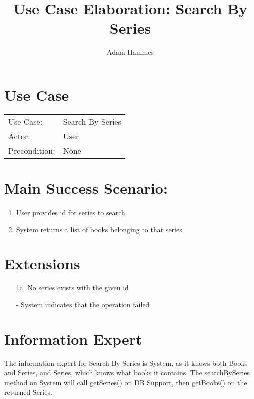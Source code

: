 \documentclass{article}
\title{Use Case Elaboration: Search By Series}
\author{ Adam Hammes }
\begin{document}
\maketitle


\section*{Use Case}
\begin{tabular}{l l}
Use Case:     & Search By Series\\
Actor:        & User \\
Precondition: & None \\
\end{tabular}


\section*{Main Success Scenario:}

\begin{enumerate}
   \item User provides id for series to search
   \item System returns a list of books belonging to that series

\end{enumerate}

\section*{Extensions}

\begin{itemize}
    \item [1a.] No series exists with the given id

    - System indicates that the operation failed
                            
\end{itemize}


\section*{Information Expert}

The information expert for Search By Series is System, as it knows both Books
and Series, and Series, which knows what books it contains.
The searchBySeries method on System will call getSeries() on DB Support, then
getBooks() on the returned Series.
\end{document}
